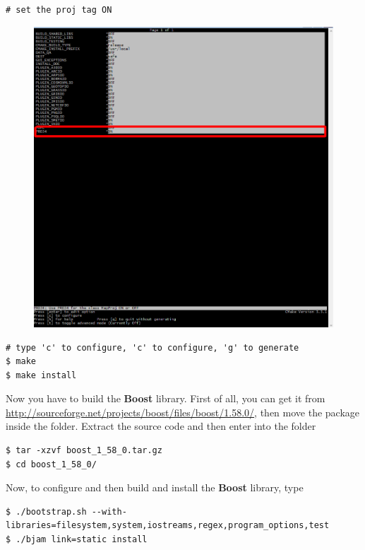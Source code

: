 \pagebreak

\begin{lstlisting}[style=bashStyle]
# set the proj tag ON
\end{lstlisting}

\begin{figure}[h]
  \includegraphics[width=\linewidth]{2015/Aug/25/11pic.png}
\end{figure}

\begin{lstlisting}[style=bashStyle]
# type 'c' to configure, 'c' to configure, 'g' to generate
$ make
$ make install
\end{lstlisting} %

Now you have to build the \textbf{Boost} library. First of all, you can get it from \url{http://sourceforge.net/projects/boost/files/boost/1.58.0/}, then move the package inside the  folder. Extract the source code and then enter into the folder

\begin{lstlisting}[style=bashStyle]
$ tar -xzvf boost_1_58_0.tar.gz
$ cd boost_1_58_0/
\end{lstlisting}

Now, to configure and then build and install the \textbf{Boost} library, type

\begin{lstlisting}[style=bashStyle]
$ ./bootstrap.sh --with-libraries=filesystem,system,iostreams,regex,program_options,test
$ ./bjam link=static install
\end{lstlisting} %

